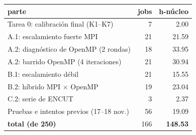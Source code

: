 \begin{tabular}{l r r}
\toprule
parte & jobs & h-núcleo \\
\midrule
Tarea 0: calibración final (K1--K7) & 7 & 2.00 \\
A.1: escalamiento fuerte MPI & 21 & 21.59 \\
A.2: diagnóstico de OpenMP (2 rondas) & 18 & 33.95 \\
A.2: barrido OpenMP (4 iteraciones) & 21 & 30.94 \\
B.1: escalamiento débil & 21 & 15.55 \\
B.2: híbrido MPI $\times$ OpenMP & 19 & 23.04 \\
C.2: serie de ENCUT & 3 & 2.37 \\
Pruebas e intentos previos (17--18 nov.) & 56 & 19.09 \\
\midrule
\textbf{total (de 250)} & 166 & \textbf{148.53} \\
\bottomrule
\end{tabular}
